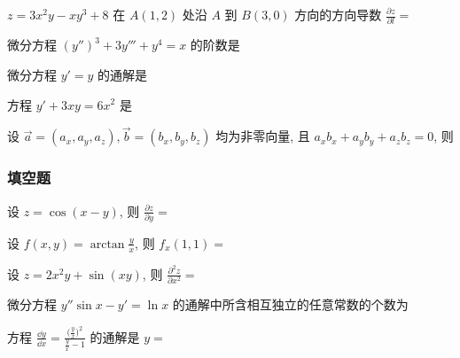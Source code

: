\begin{ti}
	$z = 3x^{2}y - xy^{3} + 8$ 在 $A(1,2)$ 处沿 $A$ 到 $B(3,0)$ 方向的方向导数 $\frac{\partial z}{\partial l} = $ \kuo
\end{ti}

\begin{ti}
	微分方程 $(y'')^{3} + 3y''' + y^{4} = x$ 的阶数是 \kuo
\end{ti}

\begin{ti}
	微分方程 $y' = y$ 的通解是 \kuo
\end{ti}

\begin{ti}
	方程 $y' + 3xy = 6x^{2}$ 是 \kuo
\end{ti}

\begin{ti}
	设 $\vec{a} = (a_{x},a_{y},a_{z}), \vec{b} = (b_{x},b_{y},b_{z})$ 均为非零向量, 且 $a_{x}b_{x} + a_{y}b_{y} + a_{z}b_{z} = 0$, 则 \kuo
\end{ti}

\subsubsection{填空题}
\begin{ti}
	设 $z = \cos(x - y)$, 则 $\frac{\partial z}{\partial y} = $ \hua
\end{ti}

\begin{ti}
	设 $f(x,y) = \arctan \frac{y}{x}$, 则 $f_{x}(1,1) = $ \hua
\end{ti}

\begin{ti}
	设 $z = 2x^{2}y + \sin(xy)$, 则 $\frac{\partial^{2}z}{\partial x^{2}} = $ \hua
\end{ti}

\begin{ti}
	微分方程 $y'' \sin x - y' = \ln x$ 的通解中所含相互独立的任意常数的个数为 \hua
\end{ti}

\begin{ti}
	方程 $\frac{\dd{y}}{\dd{x}} = \frac{\bigl( \frac{y}{x} \bigr)^{2}}{\frac{y}{x} - 1}$ 的通解是 $y = $ \hua
\end{ti}

